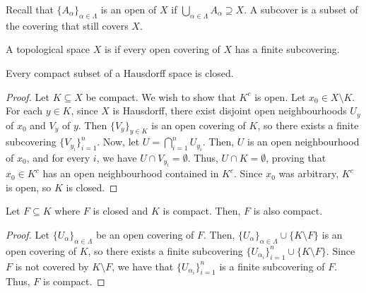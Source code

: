 Recall that $\{A_{\alpha}\}_{\alpha \in \Lambda}$ is an open  of $X$ if $\bigcup_{\alpha \in \Lambda} A_{\alpha} \supseteq X$. A subcover is a subset of the covering that still covers $X$.

\begin{definition}
    A topological space $X$ is  if every open covering of $X$ has a finite subcovering.
\end{definition}

\begin{theorem}
    Every compact subset of a Hausdorff space is closed.
\end{theorem}
\begin{proof}
    Let $K \subseteq X$ be compact. We wish to show that $K^{c}$ is open. Let $x_{0} \in X \setminus K$. For each $y \in K$, since $X$ is Hausdorff, there exist disjoint open neighbourhoods $U_{y}$ of $x_{0}$ and $V_{y}$ of $y$. Then $\{V_{y}\}_{y \in K}$ is an open covering of $K$, so there exists a finite subcovering $\{V_{y_{i}}\}_{i=1}^{n}$. Now, let $U = \bigcap_{i=1}^{n} U_{y_{i}}$. Then, $U$ is an open neighbourhood of $x_{0}$, and for every $i$, we have $U \cap V_{y_{i}} = \emptyset$. Thus, $U \cap K = \emptyset$, proving that $x_{0} \in K^{c}$ has an open neighbourhood contained in $K^{c}$. Since $x_{0}$ was arbitrary, $K^{c}$ is open, so $K$ is closed.
\end{proof}

\begin{lemma}
    Let $F \subseteq K$ where $F$ is closed and $K$ is compact. Then, $F$ is also compact.
\end{lemma}
\begin{proof}
    Let $\{U_{\alpha}\}_{\alpha \in \Lambda}$ be an open covering of $F$. Then, $\{U_{\alpha}\}_{\alpha \in \Lambda} \cup \{K \setminus F\}$ is an open covering of $K$, so there exists a finite subcovering $\{U_{\alpha_{i}}\}_{i=1}^{n} \cup \{K \setminus F\}$. Since $F$ is not covered by $K \setminus F$, we have that $\{U_{\alpha_{i}}\}_{i=1}^{n}$ is a finite subcovering of $F$. Thus, $F$ is compact.
\end{proof}

